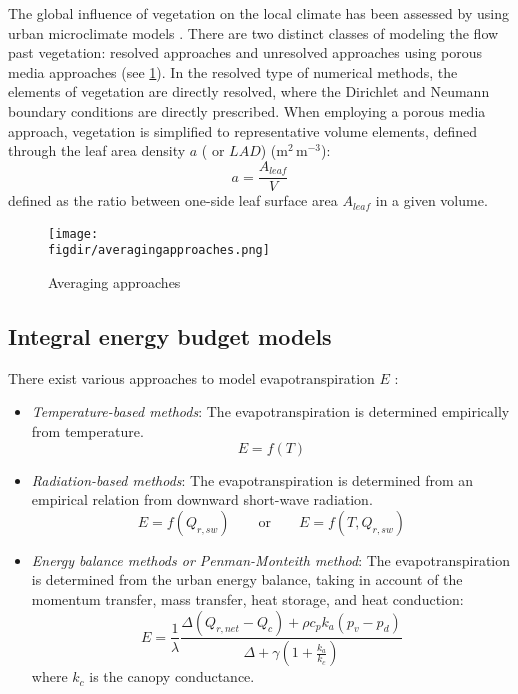 The global influence of vegetation on the local climate has been assessed by using urban microclimate models \citep{Bruse1998, Robitu2006}. There are two distinct classes of modeling the flow past vegetation: resolved approaches \citep{Endalew2009,Endalew2006} and unresolved approaches using porous media approaches \citep{Sanz2003, Kenjeres2013, Gromke2014, Katul2004} (see \cref{fig:averagingapproaches}). In the resolved type of numerical methods, the elements of vegetation are directly resolved, where the Dirichlet and Neumann boundary conditions are directly prescribed. When employing a porous media approach, vegetation is simplified to representative volume elements, defined through the leaf area density $a$ ( or $\textit{LAD}$) (m$^2$\,m$^{-3}$):
\begin{equation}
a = \frac{A_{\textit{leaf}}}{V}
\end{equation}
defined as the ratio between one-side leaf surface area $A_{\textit{leaf}}$ in a given volume. 

	\begin{figure}[h]
		\centering
		\texttt{[image: \\figdir/averagingapproaches.png]}
		\caption{Averaging approaches}
		\label{fig:averagingapproaches}
	\end{figure}	

\subsection{Integral energy budget models}

There exist various approaches to model evapotranspiration $E$ \citep{abtew2012evaporation}: 

\begin{itemize}
	\item \textit{Temperature-based methods}: The evapotranspiration is determined empirically from temperature.
		\begin{equation}
		E = f(T)
		\end{equation}
	\item \textit{Radiation-based methods}: The evapotranspiration is determined from an empirical relation from downward short-wave radiation.
		\begin{equation}
			E = f(Q_{r,sw}) \qquad \mathrm{or} \qquad E = f(T,Q_{r,sw})
		\end{equation}
	\item \textit{Energy balance methods or Penman-Monteith method}: The evapotranspiration is determined from the urban energy balance, taking in account of the momentum transfer, mass transfer, heat storage, and heat conduction:
		\begin{equation}
			E = \frac{1}{\lambda} \frac{\Delta \left(Q_{r,net}-Q_c\right) + \rho c_p k_a \left(p_v - p_d\right)}{\Delta + \gamma \left(1 + \frac{k_a}{k_c}\right) }
		\end{equation}
	where $k_c$ is the canopy conductance.
\end{itemize}

